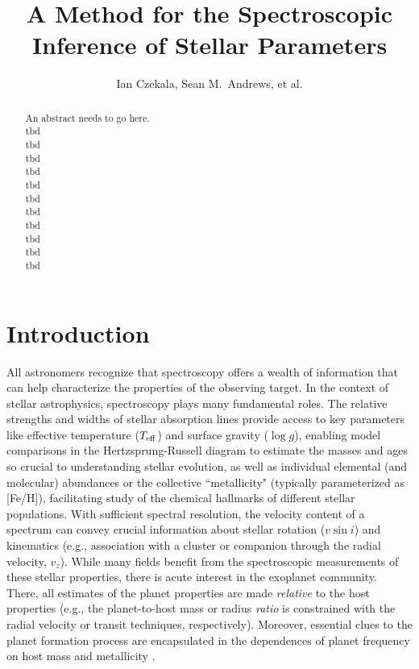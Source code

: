 \documentclass[iop,floatfix]{emulateapj}
\begin{document}
\graphicspath{{figs/}}



\title{A Method for the Spectroscopic Inference of Stellar Parameters}
\author{Ian Czekala, Sean M.~Andrews, et al.}

\begin{abstract}
An abstract needs to go here. \\
tbd \\
tbd \\
tbd \\
tbd \\
tbd \\
tbd \\
tbd \\
tbd \\
tbd \\
tbd \\
tbd
\end{abstract}


\section{Introduction} \label{sec:intro}

All astronomers recognize that spectroscopy offers a wealth of information that can help
characterize the properties of the observing target.  In the context of stellar astrophysics, 
spectroscopy plays many fundamental roles.  The relative strengths and widths of stellar absorption 
lines provide access to key parameters like effective temperature ($T_{\rm eff}$) and surface 
gravity ($\log g$), enabling model comparisons in the Hertzsprung-Russell diagram to estimate the 
masses and ages so crucial to understanding stellar evolution, as well as individual elemental (and 
molecular) abundances or the collective ``metallicity" (typically parameterized as [Fe/H]), 
facilitating study of the chemical hallmarks of different stellar populations.  With sufficient 
spectral resolution, the velocity content of a spectrum can convey crucial information about 
stellar rotation ($v \sin i$) and kinematics (e.g., association with a cluster or companion through 
the radial velocity, $v_z$).  While many fields benefit from the spectroscopic measurements of 
these stellar properties, there is acute interest in the exoplanet community.  There, all estimates 
of the planet properties are made {\it relative} to the host properties (e.g., the planet-to-host 
mass or radius {\it ratio} is constrained with the radial velocity or transit techniques, 
respectively).  Moreover, essential clues to the planet formation process are encapsulated in the 
dependences of planet frequency on host mass \citep[e.g.,][]{johnson07,howard10} and metallicity 
\citep[e.g.,][]{fischer05,buchhave14}.   
\end{document}
